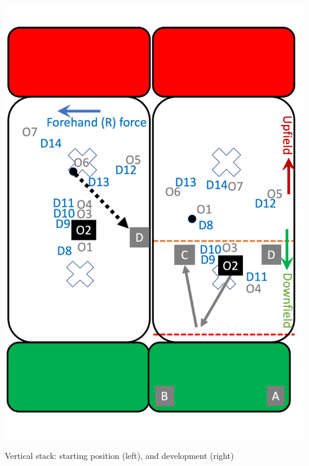 \documentclass{tufte-handout}
\begin{document}
\begin{marginfigure}%
  \includegraphics[width=\linewidth]{O2-vertical}
  \caption{Vertical stack: 
  starting position (left),
  and development (right)}
  \label{fig:O2-vertical}
\end{marginfigure}
\end{document}
